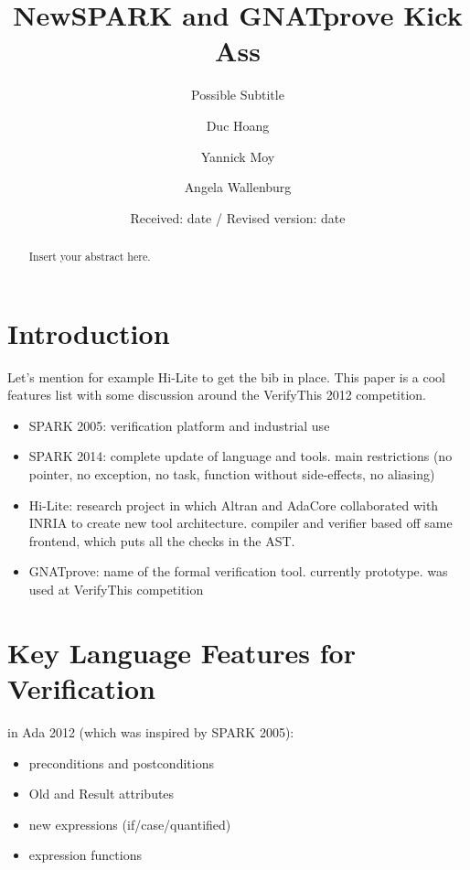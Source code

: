 \documentclass[sttt,draft]{svjour}
\begin{document}
%
\title{NewSPARK and GNATprove Kick Ass}
\subtitle{Possible Subtitle}
\author{Duc Hoang \and Yannick Moy \and Angela Wallenburg
}                     %

\date{Received: date / Revised version: date}
%
\maketitle
%
\begin{abstract}
Insert your abstract here.
\end{abstract}
%
\section{Introduction}
\label{intro}
Let's mention for example Hi-Lite \cite{hiliteERTS2012} to get the bib in place. This paper is a cool features list with some discussion around the VerifyThis 2012 competition.

\begin{itemize}
\item SPARK 2005: verification platform and industrial use
\item SPARK 2014: complete update of language and tools. main restrictions (no
  pointer, no exception, no task, function without side-effects, no aliasing)
\item Hi-Lite: research project in which Altran and AdaCore collaborated with
  INRIA to create new tool architecture. compiler and verifier based off same
  frontend, which puts all the checks in the AST.
\item GNATprove: name of the formal verification tool. currently prototype. was
  used at VerifyThis competition
\end{itemize}

\section{Key Language Features for Verification}

in Ada 2012 (which was inspired by SPARK 2005):
\begin{itemize}
\item preconditions and postconditions
\item Old and Result attributes
\item new expressions (if/case/quantified)
\item expression functions
\end{itemize}
\end{document}
